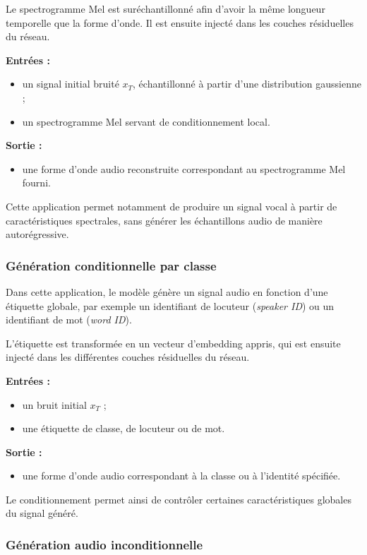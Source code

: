 Le spectrogramme Mel est suréchantillonné afin d'avoir la même
longueur temporelle que la forme d'onde. Il est ensuite injecté
dans les couches résiduelles du réseau.

\textbf{Entrées :}
\begin{itemize}
    \item un signal initial bruité $x_T$, échantillonné à partir
    d'une distribution gaussienne ;
    \item un spectrogramme Mel servant de conditionnement local.
\end{itemize}

\textbf{Sortie :}
\begin{itemize}
    \item une forme d'onde audio reconstruite correspondant
    au spectrogramme Mel fourni.
\end{itemize}

Cette application permet notamment de produire un signal vocal
à partir de caractéristiques spectrales, sans générer les
échantillons audio de manière autorégressive.

\subsubsection{Génération conditionnelle par classe}

Dans cette application, le modèle génère un signal audio en
fonction d'une étiquette globale, par exemple un identifiant
de locuteur (\textit{speaker ID}) ou un identifiant de mot
(\textit{word ID}).

L'étiquette est transformée en un vecteur d'embedding appris,
qui est ensuite injecté dans les différentes couches résiduelles
du réseau.

\textbf{Entrées :}
\begin{itemize}
    \item un bruit initial $x_T$ ;
    \item une étiquette de classe, de locuteur ou de mot.
\end{itemize}

\textbf{Sortie :}
\begin{itemize}
    \item une forme d'onde audio correspondant à la classe
    ou à l'identité spécifiée.
\end{itemize}

Le conditionnement permet ainsi de contrôler certaines
caractéristiques globales du signal généré.

\subsubsection{Génération audio inconditionnelle}

